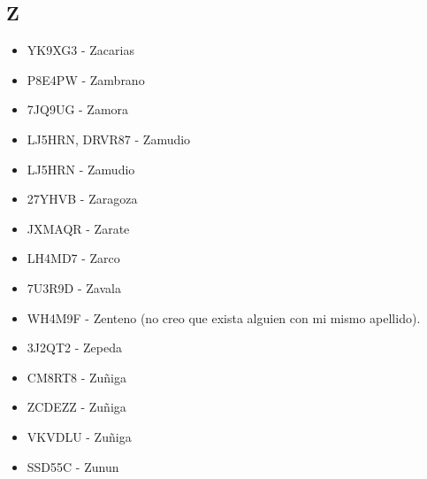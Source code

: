 \subsection*{Z}
\begin{itemize}[leftmargin=*,nosep]
\item YK9XG3 - Zacarias
\item P8E4PW - Zambrano
\item 7JQ9UG - Zamora
\item LJ5HRN, DRVR87 - Zamudio
\item LJ5HRN  -  Zamudio
\item 27YHVB  -  Zaragoza
\item JXMAQR - Zarate
\item LH4MD7 - Zarco
\item 7U3R9D - Zavala
\item WH4M9F - Zenteno (no creo que exista alguien con mi mismo apellido).
\item 3J2QT2  -  Zepeda
\item CM8RT8 - Zuñiga
\item ZCDEZZ - Zuñiga
\item VKVDLU  -  Zuñiga
\item SSD55C - Zunun
\end{itemize}
